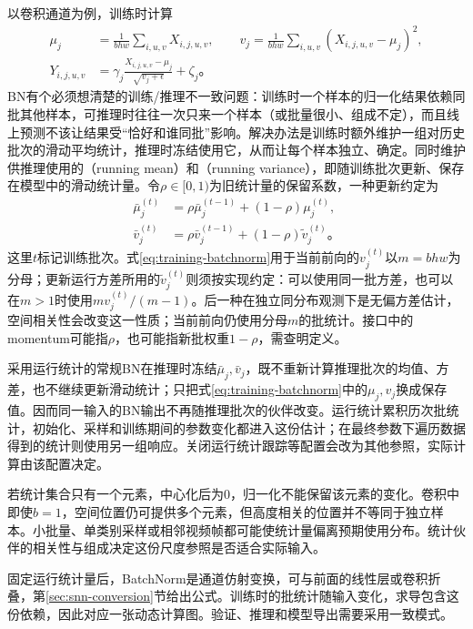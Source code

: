 以卷积通道为例，训练时计算
\begin{equation}
  \begin{aligned}
  \mu_j&=\frac1{bhw}\sum_{i,u,v}X_{i,j,u,v},\qquad
  v_j=\frac1{bhw}\sum_{i,u,v}(X_{i,j,u,v}-\mu_j)^2,\\
  Y_{i,j,u,v}&=\gamma_j\frac{X_{i,j,u,v}-\mu_j}{\sqrt{v_j+\epsilon}}+\zeta_j\text{。}
  \end{aligned}
  \label{eq:training-batchnorm}
\end{equation}
BN有个必须想清楚的训练/推理不一致问题：训练时一个样本的归一化结果依赖同批其他样本，可推理时往往一次只来一个样本（或批量很小、组成不定），而且线上预测不该让结果受“恰好和谁同批”影响。解决办法是训练时额外维护一组对历史批次的滑动平均统计，推理时冻结使用它，从而让每个样本独立、确定。同时维护供推理使用的（running mean）和（running variance），即随训练批次更新、保存在模型中的滑动统计量。令$\rho\in[0,1)$为旧统计量的保留系数，一种更新约定为
\begin{equation}
  \begin{aligned}
    \bar\mu_j^{(t)}&=\rho\bar\mu_j^{(t-1)}+(1-\rho)\mu_j^{(t)},\\
    \bar v_j^{(t)}&=\rho\bar v_j^{(t-1)}+(1-\rho)\widetilde v_j^{(t)}\text{。}
  \end{aligned}
  \label{eq:training-batchnorm-running}
\end{equation}
这里$t$标记训练批次。式\eqref{eq:training-batchnorm}用于当前前向的$v_j^{(t)}$以$m=bhw$为分母；更新运行方差所用的$\widetilde v_j^{(t)}$则须按实现约定：可以使用同一批方差，也可以在$m>1$时使用$m v_j^{(t)}/(m-1)$。后一种在独立同分布观测下是无偏方差估计，空间相关性会改变这一性质；当前前向仍使用分母$m$的批统计。接口中的momentum可能指$\rho$，也可能指新批权重$1-\rho$，需查明定义。

采用运行统计的常规BN在推理时冻结$\bar\mu_j,\bar v_j$，既不重新计算推理批次的均值、方差，也不继续更新滑动统计；只把式\eqref{eq:training-batchnorm}中的$\mu_j,v_j$换成保存值。因而同一输入的BN输出不再随推理批次的伙伴改变。运行统计累积历次批统计，初始化、采样和训练期间的参数变化都进入这份估计；在最终参数下遍历数据得到的统计则使用另一组响应。关闭运行统计跟踪等配置会改为其他参照，实际计算由该配置决定。

若统计集合只有一个元素，中心化后为0，归一化不能保留该元素的变化。卷积中即使$b=1$，空间位置仍可提供多个元素，但高度相关的位置并不等同于独立样本。小批量、单类别采样或相邻视频帧都可能使统计量偏离预期使用分布。统计伙伴的相关性与组成决定这份尺度参照是否适合实际输入。

固定运行统计量后，BatchNorm是通道仿射变换，可与前面的线性层或卷积折叠，第\ref{sec:snn-conversion}节给出公式。训练时的批统计随输入变化，求导包含这份依赖，因此对应一张动态计算图。验证、推理和模型导出需要采用一致模式。

